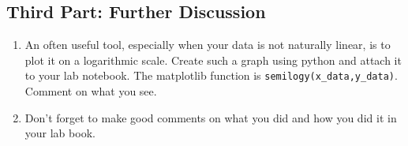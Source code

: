 \documentclass{book}
\begin{document}
\subsection{Third Part: Further Discussion}

\begin{enumerate}
\item An often useful tool, especially when your data is not naturally linear,
is to plot it on a logarithmic scale. Create such a graph using python and attach it to your lab notebook.  The matplotlib function is \texttt{semilogy(x\_data,y\_data)}. Comment on what you see.

\item Don't forget to make good comments on what you did and how you did it in
your lab book.
\end{enumerate}
\end{document}
